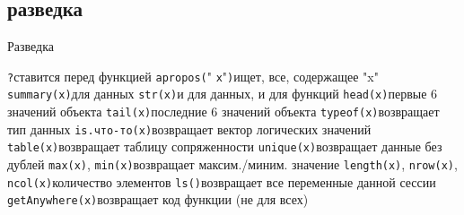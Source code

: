 \subsection{разведка}
\begin{frame}{Разведка}
\begin{itemize}
\mytem \footnotesize \verb"?"\normalsize\hfill ставится перед функцией
\mytem \footnotesize \verb"apropos("" \verb"x""\verb")"\normalsize\hfill ищет, все, содержащее "x"
\mytem \footnotesize \verb"summary(x)"\normalsize\hfill для данных
\mytem \footnotesize \verb"str(x)"\normalsize\hfill и для данных, и для функций
\mytem \footnotesize \verb"head(x)"\normalsize\hfill первые 6 значений объекта
\mytem \footnotesize \verb"tail(x)"\normalsize\hfill последние 6 значений объекта
\mytem \footnotesize \verb"typeof(x)"\normalsize\hfill возвращает тип данных
\mytem \footnotesize \verb"is.что-то(x)"\normalsize\hfill возвращает вектор логических значений
\mytem \footnotesize \verb"table(x)"\normalsize\hfill возвращает таблицу сопряженности
\mytem \footnotesize \verb"unique(x)"\normalsize\hfill возвращает данные без дублей
\mytem \footnotesize \verb"max(x)"\normalsize, \footnotesize \verb"min(x)"\normalsize \hfill возвращает максим./миним. значение
\mytem \footnotesize\verb"length(x)"\normalsize, \footnotesize \verb"nrow(x)"\normalsize, \footnotesize \verb"ncol(x)"\normalsize\hfill количество элементов
\mytem \footnotesize \verb"ls()"\normalsize\hfill возвращает все переменные данной сессии
\mytem \footnotesize \verb"getAnywhere(x)"\normalsize\hfill возвращает код функции (не для всех)
\end{itemize}
\end{frame}
